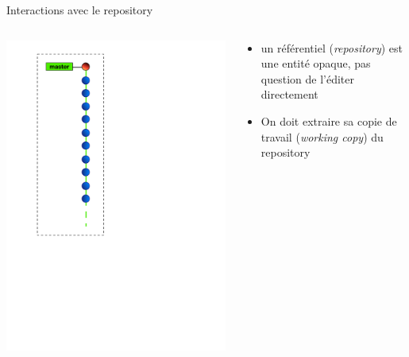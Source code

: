 \begin{frame}{%
\protect\hypertarget{interactions-avec-le-repository}{%
Interactions avec le repository}}

\begin{columns}[T]
\begin{column}{0.40\textwidth}
\includegraphics[height=1.5\textwidth]{images/master.pdf}
\end{column}

\begin{column}{0.60\textwidth}
\begin{itemize}
\tightlist
\item
  un référentiel (\emph{repository}) est une entité opaque, pas question
  de l’éditer directement
\item
  On doit extraire sa copie de travail (\emph{working copy}) du
  repository
\end{itemize}
\end{column}
\end{columns}

\end{frame}

